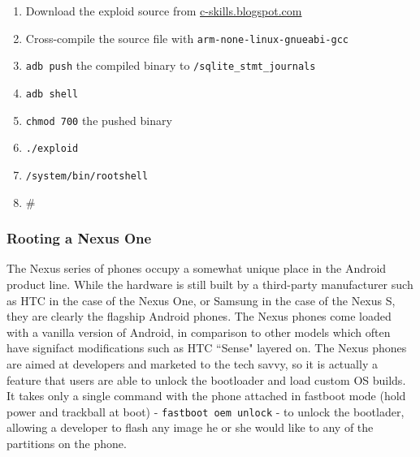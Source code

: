 \begin{enumerate}
	\item Download the exploid source from \url{c-skills.blogspot.com}
	\item Cross-compile the source file with \texttt{arm-none-linux-gnueabi-gcc}
	\item \texttt{adb push} the compiled binary to \texttt{/sqlite\_stmt\_journals}
	\item \texttt{adb shell}
	\item \texttt{chmod 700} the pushed binary
	\item \texttt{./exploid}
	\item \texttt{/system/bin/rootshell}
	\item \#
\end{enumerate}

\subsubsection{Rooting a Nexus One}

The Nexus series of phones occupy a somewhat unique place in the Android product line.  While the hardware is still built by a
third-party manufacturer such as HTC in the case of the Nexus One, or Samsung in the case of the Nexus S, they are clearly the
flagship Android phones.  The Nexus phones come loaded with a vanilla version of Android, in comparison to other models which often
have signifact modifications such as HTC ``Sense" layered on.  The Nexus phones are aimed at developers and marketed to the tech
savvy, so it is actually a feature that users are able to unlock the bootloader and load custom OS builds.  It takes only a single
command with the phone attached in fastboot mode (hold power and trackball at boot) - \texttt{fastboot oem unlock} - to unlock the
bootlader, allowing a developer to flash any image he or she would like to any of the partitions on the phone.

